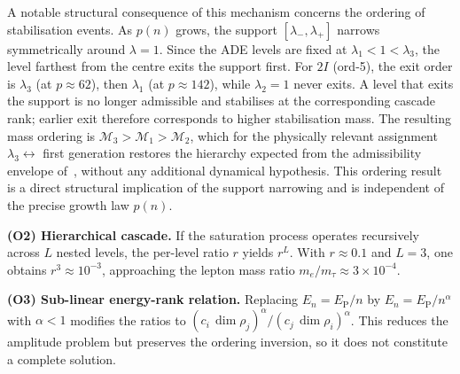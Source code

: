 \documentclass[12pt, a4paper]{article}
\theoremstyle{plain}
\theoremstyle{definition}
\theoremstyle{remark}
\begin{document}
      A notable structural consequence of this mechanism concerns the ordering
      of stabilisation events.
      As $p(n)$ grows, the support $[\lambda_-, \lambda_+]$ narrows symmetrically
      around $\lambda = 1$.
      Since the ADE levels are fixed at $\lambda_1 < 1 < \lambda_3$, the level
      farthest from the centre exits the support first.
      For $2I$ (ord-5), the exit order is $\lambda_3$ (at $p \approx 62$), then
      $\lambda_1$ (at $p \approx 142$), while $\lambda_2 = 1$ never exits.
      A level that exits the support is no longer admissible and stabilises at
      the corresponding cascade rank; earlier exit therefore corresponds to higher
      stabilisation mass.
      The resulting mass ordering is $\mathcal{M}_3 > \mathcal{M}_1 >
  \mathcal{M}_2$, which for the physically relevant assignment
      $\lambda_3 \leftrightarrow$ first generation restores the hierarchy
      expected from the admissibility envelope of~\cite{Beau2026a4},
      without any additional dynamical hypothesis.
      This ordering result is a direct structural implication of the support
      narrowing and is independent of the precise growth law $p(n)$.

      \medskip
      \noindent\textbf{(O2) Hierarchical cascade.}
      If the saturation process operates recursively across $L$ nested levels, the
      per-level ratio $r$ yields $r^L$.
      With $r \approx 0.1$ and $L = 3$, one obtains $r^3 \approx 10^{-3}$,
      approaching the lepton mass ratio $m_e/m_\tau \approx 3 \times 10^{-4}$.

      \medskip
      \noindent\textbf{(O3) Sub-linear energy-rank relation.}
      Replacing $E_n = E_{\mathrm{P}}/n$ by $E_n = E_{\mathrm{P}}/n^\alpha$ with
      $\alpha < 1$ modifies the ratios to
      $(c_i\,\dim\rho_j)^\alpha / (c_j\,\dim\rho_i)^\alpha$.
      This reduces the amplitude problem but preserves the ordering inversion, so it
      does not constitute a complete solution.
\end{document}
